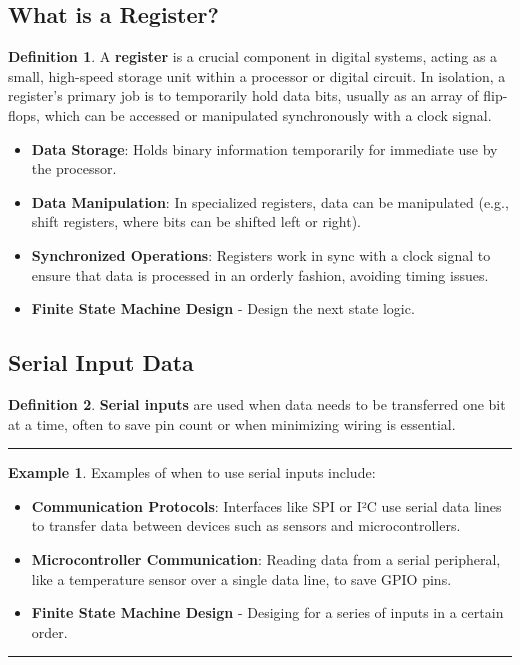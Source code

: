 \documentclass[12pt]{article}
\theoremstyle{definition}
\newtheorem{definition}{Definition}
\newtheorem{example}{Example}
\newenvironment{examp}
{
	\vspace{.5cm}
	\hrule
\begin{example}\upshape}
	{\hrule
		\vspace{0.5cm}
\end{example}}
\begin{document}
\subsection*{What is a Register?}

\begin{definition}
	A \textbf{register} is a crucial component in digital systems, acting as a small, high-speed storage unit within a processor or digital circuit. In isolation, a register’s primary job is to temporarily hold data bits, usually as an array of flip-flops, which can be accessed or manipulated synchronously with a clock signal.
\end{definition}
\begin{itemize}
	\item \textbf{Data Storage}: Holds binary information temporarily for immediate use by the processor.
	\item \textbf{Data Manipulation}: In specialized registers, data can be manipulated (e.g., shift registers, where bits can be shifted left or right).
	\item \textbf{Synchronized Operations}: Registers work in sync with a clock signal to ensure that data is processed in an orderly fashion, avoiding timing issues.
	\item \textbf{Finite State Machine Design} - Design the next state logic.
\end{itemize}

\subsection*{Serial Input Data}
\begin{definition}
	\textbf{Serial inputs} are used when data needs to be transferred one bit at a time, often to save pin count or when minimizing wiring is essential.
\end{definition}

\begin{examp}
	Examples of when to use serial inputs include:
	\begin{itemize}
		\item \textbf{Communication Protocols}: Interfaces like SPI or I²C use serial data lines to transfer data between devices such as sensors and microcontrollers.
		\item \textbf{Microcontroller Communication}: Reading data from a serial peripheral, like a temperature sensor over a single data line, to save GPIO pins.
		\item \textbf{Finite State Machine Design} - Desiging for a series of inputs in a
		      certain order.
	\end{itemize}
\end{examp}
\end{document}
